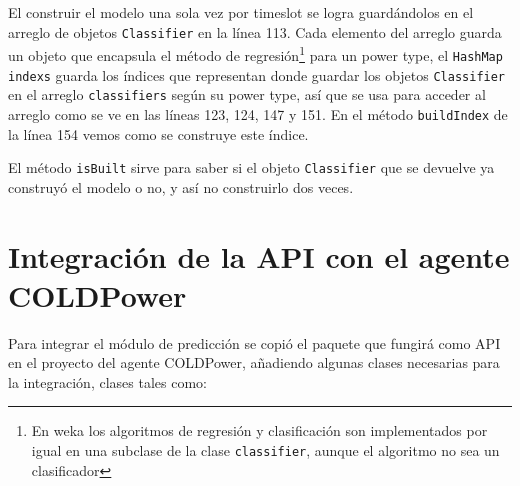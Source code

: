 El construir el modelo una sola vez por timeslot se logra guardándolos en el arreglo de objetos \texttt{Classifier} en la línea 113. Cada elemento del arreglo guarda un objeto que encapsula el método de regresión\footnote{En weka los algoritmos de regresión y clasificación son implementados por igual en una subclase de la clase \texttt{classifier}, aunque el algoritmo no sea un clasificador} para un power type, el \texttt{HashMap indexs} guarda los índices que representan donde guardar los objetos \texttt{Classifier} en el arreglo \texttt{classifiers} según su power type, así que se usa para acceder al arreglo como se ve en las líneas 123, 124, 147 y 151. En el método \texttt{buildIndex} de la línea 154 vemos como se construye este índice.

El método \texttt{isBuilt} sirve para saber si el objeto \texttt{Classifier} que se devuelve ya construyó el modelo o no, y así no construirlo dos veces.

\section{Integración de la API con el agente COLDPower} \label{sec:integracionAPI}

Para integrar el módulo de predicción  %
se copió el paquete que fungirá como API en el proyecto del agente COLDPower, añadiendo algunas clases necesarias para la integración, clases tales como:

